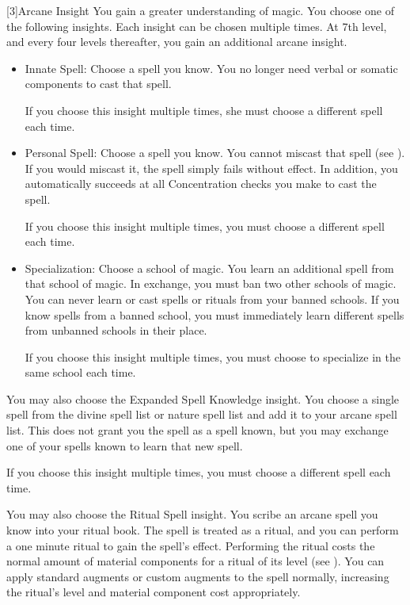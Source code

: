             [3]{Arcane Insight} 
            You gain a greater understanding of magic.
            You choose one of the following insights.
            Each insight can be chosen multiple times.
            At 7th level, and every four levels thereafter, you gain an additional arcane insight.
            \begin{itemize}
                \item Innate Spell: Choose a spell you know.
                    You no longer need verbal or somatic components to cast that spell.
                    \par If you choose this insight multiple times, she must choose a different spell each time.
                \item Personal Spell: Choose a spell you know.
                    You cannot miscast that spell (see ).
                    If you would miscast it, the spell simply fails without effect.
                    In addition, you automatically succeeds at all Concentration checks you make to cast the spell.
                    \par If you choose this insight multiple times, you must choose a different spell each time.
                \item Specialization: Choose a school of magic.
                    You learn an additional spell from that school of magic.
                    In exchange, you must ban two other schools of magic.
                    You can never learn or cast spells or rituals from your banned schools.
                    If you know spells from a banned school, you must immediately learn different spells from unbanned schools in their place.
                    \par If you choose this insight multiple times, you must choose to specialize in the same school each time.
            \end{itemize}

             You may also choose the Expanded Spell Knowledge insight.
            You choose a single spell from the divine spell list or nature spell list and add it to your arcane spell list.
            This does not grant you the spell as a spell known, but you may exchange one of your spells known to learn that new spell.
            \par If you choose this insight multiple times, you must choose a different spell each time.

             You may also choose the Ritual Spell insight.
            You scribe an arcane spell you know into your ritual book.
            The spell is treated as a ritual, and you can perform a one minute ritual to gain the spell's effect.
            Performing the ritual costs the normal amount of material components for a ritual of its level (see ).
            You can apply standard augments or custom augments to the spell normally, increasing the ritual's level and material component cost appropriately.


